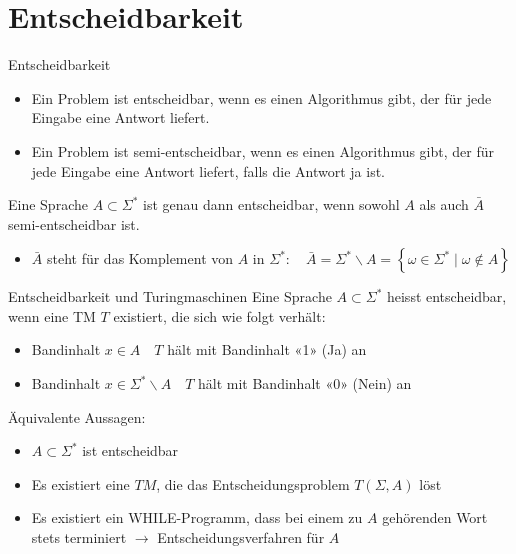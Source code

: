 \graphicspath{{images/}}

\section*{Entscheidbarkeit}

\begin{theorem}{Entscheidbarkeit}\\
    \begin{itemize}
        \item Ein Problem ist entscheidbar, wenn es einen Algorithmus gibt, der für jede Eingabe eine Antwort liefert.
        \item Ein Problem ist semi-entscheidbar, wenn es einen Algorithmus gibt, der für jede Eingabe eine Antwort liefert, falls die Antwort ja ist.
    \end{itemize}
    Eine Sprache $A \subset \Sigma^{*}$ ist genau dann entscheidbar, wenn sowohl $A$ als auch $\bar{A}$ semi-entscheidbar ist.
    \begin{itemize}
        \item $\bar{A}$ steht für das Komplement von $A$ in $\Sigma^{*}: \quad \bar{A}=\Sigma^{*} \backslash A=\left\{\omega \in \Sigma^{*} \mid \omega \notin A\right\}$
    \end{itemize}
\end{theorem}

\begin{corollary}{Entscheidbarkeit und Turingmaschinen}
    Eine Sprache $A \subset \Sigma^{*}$ heisst entscheidbar, wenn eine TM $T$ existiert, die sich wie folgt verhält:
    \begin{itemize}
    \item Bandinhalt $x \in A \quad T$ hält mit Bandinhalt «1» (Ja) an
    \item Bandinhalt $x \in \Sigma^{*} \backslash A \quad T$ hält mit Bandinhalt «0» (Nein) an
    \end{itemize}

    Äquivalente Aussagen:
    \begin{itemize}
        \item $A \subset \Sigma^{*}$ ist entscheidbar
        \item Es existiert eine $T M$, die das Entscheidungsproblem $T(\Sigma, A)$ löst
        \item Es existiert ein WHILE-Programm, dass bei einem zu $A$ gehörenden Wort stets terminiert $\rightarrow$ Entscheidungsverfahren für $A$
    \end{itemize}
\end{corollary}

